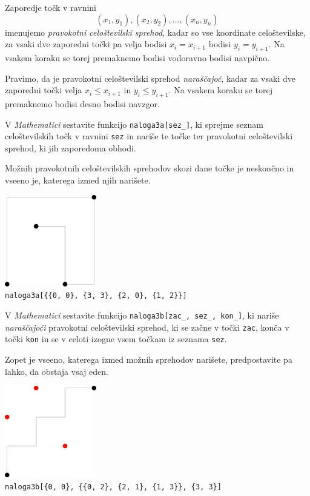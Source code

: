 \documentclass[arhiv]{izpit}
\begin{document}
\naloga[40 točk]

Zaporedje točk v ravnini
\[
  (x_1, y_1), (x_2, y_2), \dots, (x_n, y_n)
\]
imenujemo \emph{pravokotni celoštevilski sprehod},
kadar so vse koordinate celoštevilske,
za vsaki dve zaporedni točki pa velja
bodisi $x_i = x_{i + 1}$ bodisi $y_i = y_{i + 1}$.
Na vsakem koraku se torej premaknemo bodisi vodoravno bodisi navpično.

Pravimo, da je pravokotni celoštevilski sprehod \emph{naraščajoč},
kadar za vsaki dve zaporedni točki velja
$x_i \le x_{i + 1}$ in $y_i \le y_{i + 1}$.
Na vsakem koraku se torej premaknemo bodisi desno bodisi navzgor.

\podnaloga
V \emph{Mathematici} sestavite funkcijo \verb|naloga3a[sez_]|,
ki sprejme seznam celoštevilskih točk v ravnini \verb|sez| in
nariše te točke ter pravokotni celoštevilski sprehod,
ki jih zaporedoma obhodi.

Možnih pravokotnih celoštevilskih sprehodov skozi dane točke je neskončno
in vseeno je, katerega izmed njih narišete.

\begin{center}
  \includegraphics[width=0.3\textwidth]{sprehod3a.pdf} \\
  \verb|naloga3a[{{0, 0}, {3, 3}, {2, 0}, {1, 2}}]|
\end{center}

\podnaloga
V \emph{Mathematici} sestavite funkcijo \verb|naloga3b[zac_, sez_, kon_]|,
ki nariše \emph{naraščajoči} pravokotni celoštevilski sprehod,
ki se začne v točki \verb|zac|, konča v točki \verb|kon|
in se v celoti izogne vsem točkam iz seznama \verb|sez|.

Zopet je vseeno, katerega izmed možnih sprehodov narišete,
predpostavite pa lahko, da obstaja vsaj eden.

\begin{center}
  \includegraphics[width=0.3\textwidth]{sprehod3b.pdf} \\
  \verb|naloga3b[{0, 0}, {{0, 2}, {2, 1}, {1, 3}}, {3, 3}]|
\end{center}
\end{document}
